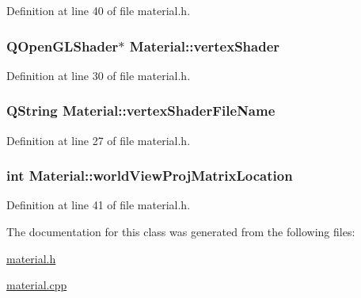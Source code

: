 Definition at line 40 of file material.\+h.

\hypertarget{class_material_af7fc01b5cbebefdc983797f60cd4772c}{}
\subsubsection[{vertex\+Shader}]{\setlength{\rightskip}{0pt plus 5cm}Q\+Open\+G\+L\+Shader$\ast$ Material\+::vertex\+Shader\hspace{0.3cm}{\ttfamily [protected]}}\label{class_material_af7fc01b5cbebefdc983797f60cd4772c}


Definition at line 30 of file material.\+h.

\hypertarget{class_material_af8361fc71a1f55c5a49100bee94bd94a}{}
\subsubsection[{vertex\+Shader\+File\+Name}]{\setlength{\rightskip}{0pt plus 5cm}Q\+String Material\+::vertex\+Shader\+File\+Name\hspace{0.3cm}{\ttfamily [protected]}}\label{class_material_af8361fc71a1f55c5a49100bee94bd94a}


Definition at line 27 of file material.\+h.

\hypertarget{class_material_a12a1db7e857ec3bcbacbcd646f5cd16f}{}
\subsubsection[{world\+View\+Proj\+Matrix\+Location}]{\setlength{\rightskip}{0pt plus 5cm}int Material\+::world\+View\+Proj\+Matrix\+Location\hspace{0.3cm}{\ttfamily [protected]}}\label{class_material_a12a1db7e857ec3bcbacbcd646f5cd16f}


Definition at line 41 of file material.\+h.



The documentation for this class was generated from the following files\+:\begin{DoxyCompactItemize}
\item 
\hyperlink{material_8h}{material.\+h}\item 
\hyperlink{material_8cpp}{material.\+cpp}\end{DoxyCompactItemize}
